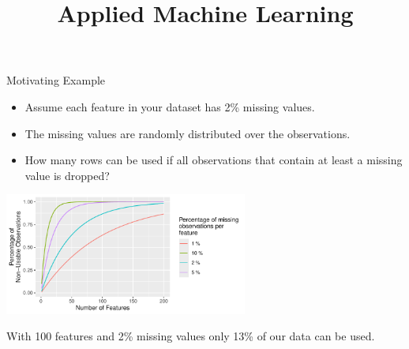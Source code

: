 \documentclass[11pt,compress,t,notes=noshow, xcolor=table]{beamer}
\title{Applied Machine Learning}
\date{}
\begin{document}


\begin{frame}{Motivating Example}

    \begin{itemize}
        \item Assume each feature in your dataset has 2\% missing values.
        \item The missing values are randomly distributed over the observations.
        \item How many rows can be used if all observations that contain at least a missing value is dropped?
    \end{itemize}
    
    \begin{center}
        \includegraphics[width=0.6\textwidth]{figure/missing_values_plot}
    \end{center}
    
    With 100 features and 2\% missing values only 13\% of our data can be used.

\end{frame}
\end{document}
